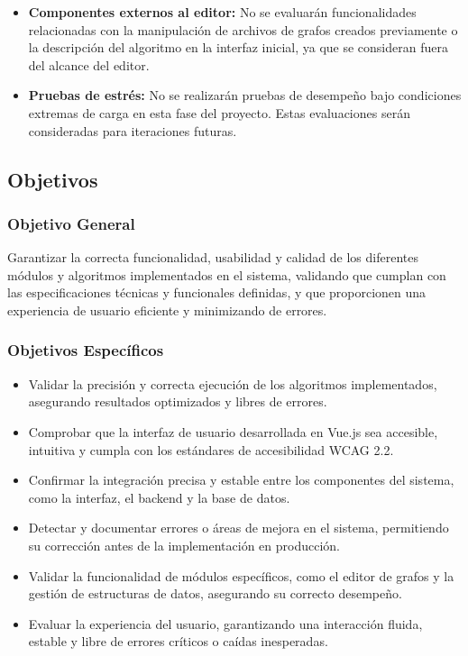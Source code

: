 \documentclass[stu, 12pt, letterpaper, donotrepeattitle, floatsintext, natbib]{apa7}
\begin{document}
\begin{itemize}
    \item \textbf{Componentes externos al editor:} No se evaluarán funcionalidades relacionadas con la manipulación de archivos de grafos creados previamente o la descripción del algoritmo en la interfaz inicial, ya que se consideran fuera del alcance del editor.
    
    \item \textbf{Pruebas de estrés:} No se realizarán pruebas de desempeño bajo condiciones extremas de carga en esta fase del proyecto. Estas evaluaciones serán consideradas para iteraciones futuras.
\end{itemize}


\subsection{Objetivos}

\subsubsection{Objetivo General}
Garantizar la correcta funcionalidad, usabilidad y calidad de los diferentes módulos y algoritmos implementados en el sistema, validando que cumplan con las especificaciones técnicas y funcionales definidas, y que proporcionen una experiencia de usuario eficiente y minimizando de errores.

\subsubsection{Objetivos Específicos}

\begin{itemize}
    \item Validar la precisión y correcta ejecución de los algoritmos implementados, asegurando resultados optimizados y libres de errores.
    \item Comprobar que la interfaz de usuario desarrollada en Vue.js sea accesible, intuitiva y cumpla con los estándares de accesibilidad WCAG 2.2.
    \item Confirmar la integración precisa y estable entre los componentes del sistema, como la interfaz, el backend y la base de datos.
    \item Detectar y documentar errores o áreas de mejora en el sistema, permitiendo su corrección antes de la implementación en producción.
    \item Validar la funcionalidad de módulos específicos, como el editor de grafos y la gestión de estructuras de datos, asegurando su correcto desempeño.
    \item Evaluar la experiencia del usuario, garantizando una interacción fluida, estable y libre de errores críticos o caídas inesperadas.
\end{itemize}
\end{document}
